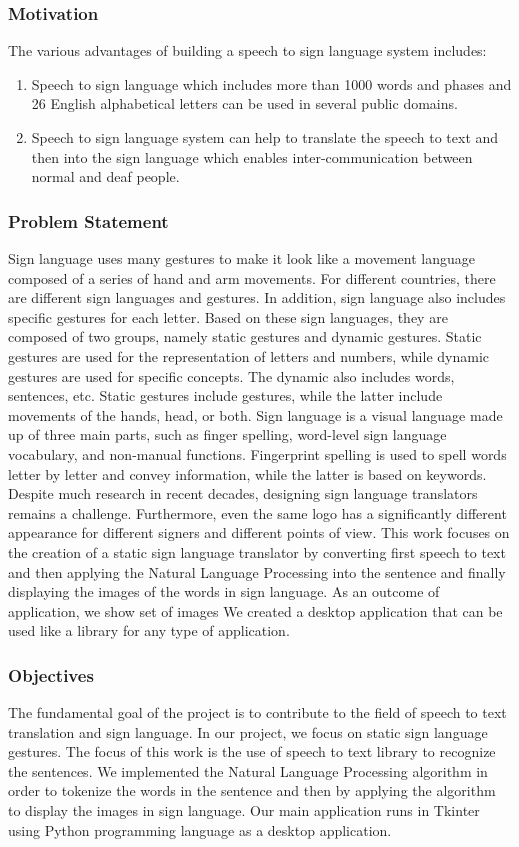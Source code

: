 \documentclass[twocolumn,10pt]{asme2ej}
\begin{document}
\subsubsection{Motivation}
The various advantages of building a speech to sign language system includes:
\begin{enumerate}
  \item Speech to sign language which includes more than 1000 words and phases and 26 English alphabetical letters can be used in several public domains.
  \item Speech to sign language system can help to translate the speech to text and then into the sign language which enables inter-communication between normal and deaf people.
\end{enumerate}

\subsubsection{Problem Statement}
Sign language uses many gestures to make it look like a movement language composed of a series of hand and arm movements. For different countries, there are different sign languages and gestures. In addition, sign language also includes specific gestures for each letter. Based on these sign languages, they are composed of two groups, namely static gestures and dynamic gestures. Static gestures are used for the representation of letters and numbers, while dynamic gestures are used for specific concepts. The dynamic also includes words, sentences, etc. Static gestures include gestures, while the latter include movements of the hands, head, or both. Sign language is a visual language made up of three main parts, such as finger spelling, word-level sign language vocabulary, and non-manual functions. Fingerprint spelling is used to spell words letter by letter and convey information, while the latter is based on keywords. Despite much research in recent decades, designing sign language translators remains a challenge. Furthermore, even the same logo has a significantly different appearance for different signers and different points of view. This work focuses on the creation of a static sign language translator by converting first speech to text and then applying the Natural Language Processing into the sentence and finally displaying the images of the words in sign language. As an outcome of application, we show set of images  We created a desktop application that can be used like a library for any type of application. 
\subsubsection{Objectives}
The fundamental goal of the project is to contribute to the field of speech to text translation and sign language. In our project, we focus on static sign language gestures. The focus of this work is the use of speech to text library to recognize the sentences. We implemented the Natural Language Processing algorithm in order to tokenize the words in the sentence and then by applying the algorithm to display the images in sign language. Our main application runs in Tkinter using Python programming language as a desktop application.
\end{document}
